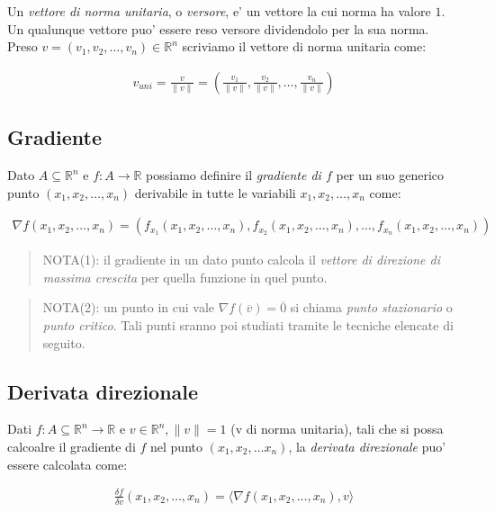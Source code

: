 \documentclass{article}
\begin{document}
Un \emph{vettore di norma unitaria}, o \emph{versore}, e' un vettore la cui norma
ha valore $1$. Un qualunque vettore puo' essere reso versore dividendolo per la
sua norma. Preso $v = (v_1, v_2, \ldots, v_n) \in \mathbb{R}^n$ scriviamo il
vettore di norma unitaria come:

\begin{align*}
  v_{uni} = \frac{v}{\|v\|} = (\frac{v_1}{\|v\|}, \frac{v_2}{\|v\|}, \ldots, \frac{v_n}{\|v\|})
\end{align*}

\subsection{Gradiente}

Dato $A \subseteq \mathbb{R}^n$ e $f : A \to \mathbb{R}$ possiamo
definire il \emph{gradiente di $f$} per un suo generico punto $(x_1, x_2,
\ldots, x_n)$ derivabile in tutte le variabili $x_1, x_2, \ldots, x_n$ come:

\begin{align*}
  \nabla f(x_1, x_2, \ldots, x_n) = (f_{x_1}(x_1, x_2, \ldots, x_n),
  f_{x_2}(x_1, x_2, \ldots, x_n), \ldots, f_{x_n}(x_1, x_2, \ldots, x_n))
\end{align*}

\begin{quote}
  NOTA(1): il gradiente in un dato punto calcola il \emph{vettore di direzione di
  massima crescita} per quella funzione in quel punto.
\end{quote}

\begin{quote}
  NOTA(2): un punto in cui vale $\nabla f(\overline{v}) = \overline{0}$ si chiama
  \emph{punto stazionario} o \emph{punto critico}. Tali punti sranno poi studiati
  tramite le tecniche elencate di seguito.
\end{quote}

\subsection{Derivata direzionale}

Dati $f: A \subseteq \mathbb{R}^n \to \mathbb{R}$ e $v \in \mathbb{R}^n, \|v\| = 1$
(v di norma unitaria), tali che si possa calcoalre il gradiente di $f$ nel punto
$(x_1, x_2, \ldots x_n)$, la \emph{derivata direzionale} puo' essere calcolata come:

\begin{align*}
  \frac{\delta f}{\delta v}(x_1, x_2, \ldots, x_n) = \langle \nabla f(x_1, x_2, \ldots, x_n), v \rangle
\end{align*}
\end{document}
